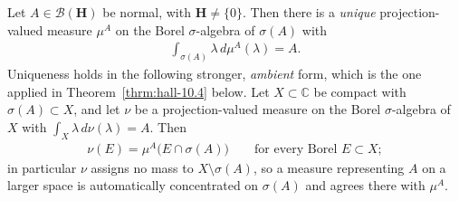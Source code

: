 \begin{theorem}
    \label{thrm:hall-10.20}
    \leanok
    Let $A \in \mathcal{B}(\mathbf{H})$ be normal, with $\mathbf{H} \ne \{0\}$. Then there is a \textit{unique} projection-valued measure $\mu^A$ on the Borel $\sigma$-algebra of $\sigma(A)$ with
    \begin{align}
        \int_{\sigma(A)} \lambda \, d\mu^A(\lambda) = A.
    \end{align}
    Uniqueness holds in the following stronger, \textit{ambient} form, which is the one applied in Theorem~\ref{thrm:hall-10.4} below. Let $X \subset \mathbb{C}$ be compact with $\sigma(A) \subset X$, and let $\nu$ be a projection-valued measure on the Borel $\sigma$-algebra of $X$ with $\int_X \lambda \, d\nu(\lambda) = A$. Then
    \begin{align}
        \nu(E) = \mu^A\big( E \cap \sigma(A) \big) \qquad \text{for every Borel } E \subset X;
    \end{align}
    in particular $\nu$ assigns no mass to $X \setminus \sigma(A)$, so a measure representing $A$ on a larger space is automatically concentrated on $\sigma(A)$ and agrees there with $\mu^A$.
\end{theorem}
